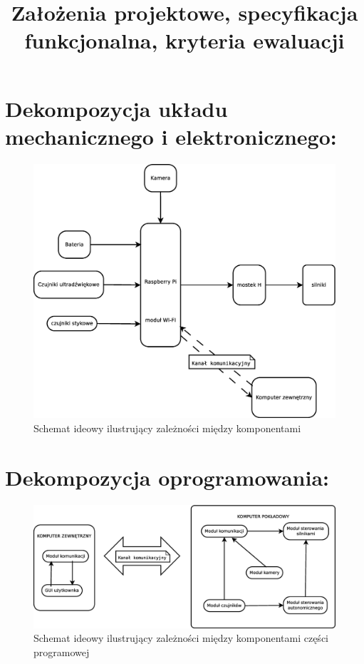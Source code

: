 \documentclass[a4paper]{article}
\title{Założenia projektowe, specyfikacja funkcjonalna, kryteria ewaluacji}
\date{}
\author{}
\begin{document}
\maketitle
 
\section{Dekompozycja układu mechanicznego i elektronicznego:} 
\begin{figure}[H]
\centering
\includegraphics[width=15cm]{idea_sprzet-mech.eps}
\caption{Schemat ideowy ilustrujący zależności między komponentami}
\end{figure}

\section{Dekompozycja oprogramowania:}
\begin{figure}[H]
\centering
\includegraphics[width=15cm]{idea_programowa.eps}
\caption{Schemat ideowy ilustrujący zależności między komponentami części programowej}
\end{figure}
\end{document}
